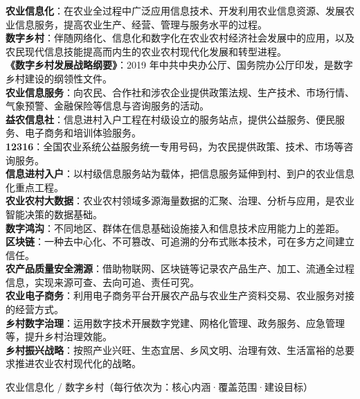 \documentclass[a4paper,11pt]{article}
\begin{document}
\begin{keyterms}
\textbf{农业信息化}：在农业全过程中广泛应用信息技术、开发利用农业信息资源、发展农业信息服务，提高农业生产、经营、管理与服务水平的过程。\\
\textbf{数字乡村}：伴随网络化、信息化和数字化在农业农村经济社会发展中的应用，以及农民现代信息技能提高而内生的农业农村现代化发展和转型进程。\\
\textbf{《数字乡村发展战略纲要》}：2019 年中共中央办公厅、国务院办公厅印发，是数字乡村建设的纲领性文件。\\
\textbf{农业信息服务}：向农民、合作社和涉农企业提供政策法规、生产技术、市场行情、气象预警、金融保险等信息与咨询服务的活动。\\
\textbf{益农信息社}：信息进村入户工程在村级设立的服务站点，提供公益服务、便民服务、电子商务和培训体验服务。\\
\textbf{12316}：全国农业系统公益服务统一专用号码，为农民提供政策、技术、市场等咨询服务。\\
\textbf{信息进村入户}：以村级信息服务站为载体，把信息服务延伸到村、到户的农业信息化重点工程。\\
\textbf{农业农村大数据}：农业农村领域多源海量数据的汇聚、治理、分析与应用，是农业智能决策的数据基础。\\
\textbf{数字鸿沟}：不同地区、群体在信息基础设施接入和信息技术应用能力上的差距。\\
\textbf{区块链}：一种去中心化、不可篡改、可追溯的分布式账本技术，可在多方之间建立信任。\\
\textbf{农产品质量安全溯源}：借助物联网、区块链等记录农产品生产、加工、流通全过程信息，实现来源可查、去向可追、责任可究。\\
\textbf{农业电子商务}：利用电子商务平台开展农产品与农业生产资料交易、农业服务对接的经营方式。\\
\textbf{乡村数字治理}：运用数字技术开展数字党建、网格化管理、政务服务、应急管理等，提升乡村治理效能。\\
\textbf{乡村振兴战略}：按照产业兴旺、生态宜居、乡风文明、治理有效、生活富裕的总要求推进农业农村现代化的战略。
\end{keyterms}

\begin{contrast}{农业信息化 / 数字乡村（每行依次为：核心内涵·覆盖范围·建设目标）}
\end{contrast}
\end{document}
